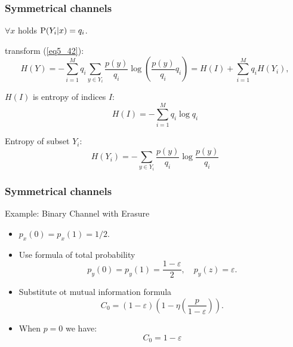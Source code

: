 \documentclass[14pt]{beamer}
\begin{document}
\begin{frame}
\frametitle{Symmetrical channels}
\begin{itemize}
\small{    
    
    
    
    \item $\forall x$ holds ${\rm P}(Y_i \vert x) = q_i $.

    \item transform (\ref{eq5_42}):
    \begin{equation}
    \label{eq5_43} H(Y) = - \sum\limits_{i = 1}^M {q_i \sum\limits_{y
    \in Y_i } {\frac{p(y)}{q_i }\log \left( {\frac{p(y)}{q_i }q_i }
    \right) = H(I) + \sum\limits_{i = 1}^M {q_i H(Y_i )} } } ,
    \end{equation}
    
    \item $H(I)$ is entropy of indices $I$:
    \[
    H(I) = - \sum\limits_{i = 1}^M {q_i \log q_i } 
    \]
    
    \item Entropy of subset $Y_i $:
    \[
    H(Y_i ) = - \sum\limits_{y \in Y_i } {\frac{p(y)}{q_i }\log
    \frac{p(y)}{q_i }}
    \]   
}
\end{itemize}
\end{frame}



\begin{frame}
\frametitle{Symmetrical channels}
Example: Binary Channel with Erasure
\begin{itemize}
    
    \item $p_x (0) = p_x (1) = 1 / 2$. 
    
    \item  Use formula of total probability
    \[
    p_y (0) = p_y (1) = \frac{1 - \varepsilon }{2},
    \quad
    p_y (z) = \varepsilon .
    \]
    
    \item Substitute ot mutual information formula
    \[
    C_0 = (1 - \varepsilon )\left( {1 - \eta\left( {\frac{p}{1 -
    \varepsilon }} \right)} \right).
    \]
    \item When $p = 0$ we have:
    \[
    C_0 = 1 - \varepsilon
    \]

\end{itemize}
\end{frame}
\end{document}
